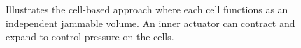 \begin{figure}
\begin{minipage}[t]{.44\textwidth}
    \caption[The cell-based jamming approach.]
    {Illustrates the cell-based approach where each cell functions as an independent jammable volume. An inner actuator can contract and expand to control pressure on the cells.}
    \label{fig:ch:jamming:approaches:cell}
  \end{minipage}%
\end{figure}

